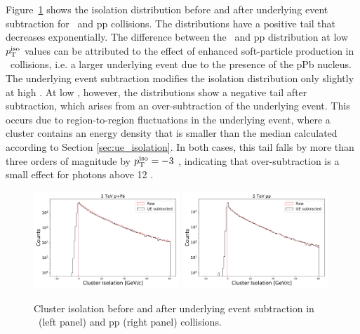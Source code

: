 Figure~\ref{fig:iso_ue} shows the isolation distribution before and after underlying event subtraction for \pPb~and pp collisions. The distributions have a positive tail that decreases exponentially. The difference between the \pPb~and pp distribution at low $p_{\mathrm{T}}^\mathrm{iso}$ values can be attributed to the effect of enhanced soft-particle production in \pPb~collisions, i.e. a larger underlying event due to the presence of the pPb nucleus. The underlying event subtraction modifies the isolation distribution only slightly at high \pt. At low \pt, however, the distributions show a negative tail after subtraction, which arises from an over-subtraction of the underlying event. This occurs due to region-to-region fluctuations in the underlying event, where a cluster contains an energy density that is smaller than the median calculated according to Section \ref{sec:ue_isolation}. In both cases, this tail falls by more than three orders of magnitude by $p_{\mathrm{T}}^\mathrm{iso}=-3$ \GeVc, indicating that over-subtraction is a small effect for photons above 12 \GeVc.   

\begin{figure}[hbtp]
\center
\includegraphics[width=0.49\textwidth]{Data_Analysis/Isolation/IsolationWithUESubtraction_Skimmed_13def_root}
\includegraphics[width=0.49\textwidth]{Data_Analysis/Isolation/IsolationWithUESubtraction_Skimmed_17q_root}
\caption{Cluster isolation before and after underlying event subtraction in \pPb~(left panel) and pp (right panel) collisions.}
\label{fig:iso_ue}
\end{figure}

